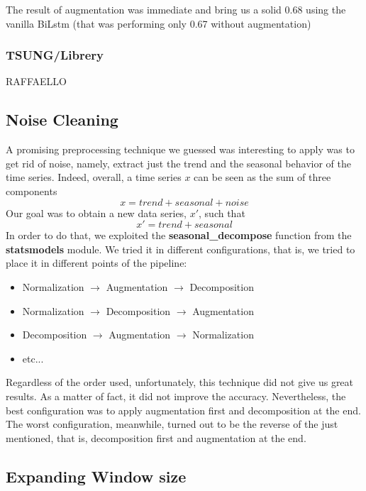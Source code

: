 \documentclass[11pt]{article}
\begin{document}
The result of augmentation was immediate and bring us a solid 0.68 using the vanilla BiLstm (that was performing only 0.67 without augmentation)
\subsubsection{TSUNG/Librery}
 RAFFAELLO
\subsection{Noise Cleaning}
A promising preprocessing technique we guessed was interesting to apply was to get rid of noise, namely, extract just the trend and the seasonal behavior of the time series. Indeed, overall, a time series $x$ can be seen as the sum of three components
\begin{equation*}
    x = trend + seasonal + noise
\end{equation*}
Our goal was to obtain a new data series, $x'$, such that
\begin{equation*}
    x' = trend + seasonal
\end{equation*}
In order to do that, we exploited the \textbf{seasonal\_decompose} function from the \textbf{statsmodels} module. We tried it in different configurations, that is, we tried to place it in different points of the pipeline:
\begin{itemize}
    \item Normalization $\rightarrow$ Augmentation $\rightarrow$ Decomposition
    \item Normalization $\rightarrow$ Decomposition $\rightarrow$ Augmentation
    \item Decomposition $\rightarrow$ Augmentation $\rightarrow$ Normalization
    \item etc...
\end{itemize}
Regardless of the order used, unfortunately, this technique did not give us great results. As a matter of fact, it did not improve the accuracy. Nevertheless, the best configuration was to apply augmentation first and decomposition at the end. The worst configuration, meanwhile, turned out to be the reverse of the just mentioned, that is, decomposition first and augmentation at the end.
\subsection{Expanding Window size}
\end{document}
